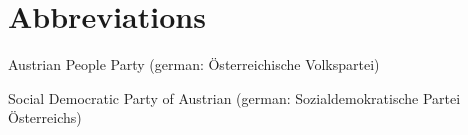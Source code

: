 \chapter*{Abbreviations}

\begin{description}
\setlength{\itemsep}{-11pt}
\setlength{\leftmargin}{900pt}

\item[ÖVP] Austrian People Party (german: Österreichische Volkspartei)

\item[SPÖ] Social Democratic Party of Austrian (german: Sozialdemokratische Partei Österreichs)

\end{description}
